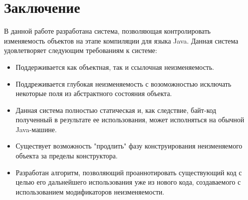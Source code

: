 \chapter{Заключение}

В данной работе разработана система, позволяющая контролировать изменяемость объектов на этапе компиляции для языка Java. Данная система удовлетворяет следующим требованиям к системе:
\begin{itemize}
	\item Поддерживается как объектная, так и ссылочная неизменяемость.
	\item Поддреживается глубокая неизменяемость с возоможностью исключать некоторые поля из абстрактного состояния объекта.
	\item Данная система полностью статическая и, как следствие, байт-код полученный в результате ее использования, может исполняться на обычной Java-машине.
	\item Существует возможность "продлить" фазу конструирования неизменяемого объекта за пределы конструктора.
	\item Разработан алгоритм, позволяющий проаннотировать существующий код с целью его дальнейшего использования уже из нового кода, создаваемого с использованием модификаторов неизменяемости.	  
\end{itemize}



